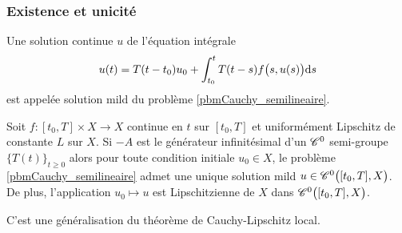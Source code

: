 \subsubsection{Existence et unicité}
\begin{definition}
    Une solution continue $u$ de l'équation intégrale
    \begin{equation*}
        u(t) = T(t-t_0)u_0 + \int_{t_0}^t T(t-s)f\big(s,u(s)\big)\mathrm{d} s
    \end{equation*}
    est appelée \textcolor{astral}{solution mild} du problème \eqref{pbmCauchy_semilineaire}.
\end{definition}

\begin{theorem}
    Soit $f:[t_0,T] \times X \rightarrow X$ continue en $t$ sur $[t_0,T]$ et uniformément Lipschitz de constante $L$ sur $X$. Si $-A$ est le générateur infinitésimal d'un $\mathscr{C}^0$ semi-groupe $\big\{T(t)\big\}_{t \geq 0}$ alors pour toute condition initiale $u_0 \in X$, le problème \eqref{pbmCauchy_semilineaire} admet une unique solution mild $u \in \mathscr{C}^0\big([t_0,T],X\big)$. De plus, l'application $u_0 \mapsto u$ est Lipschitzienne de $X$ dans $\mathscr{C}^0\big([t_0,T],X\big)$.
\end{theorem}

\begin{remark}
    C'est une généralisation du théorème de Cauchy-Lipschitz local.
\end{remark}

